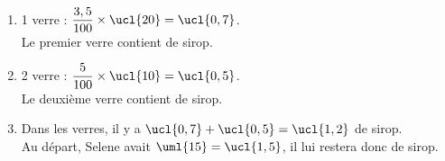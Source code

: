 \ \\ [-5mm]
   \begin{enumerate}
      \item 1 verre : $\dfrac{3,5}{100}\times\ucl{20} =\ucl{0,7}$. \\ [1mm]
         {\blue Le premier verre contient  de sirop}. \smallskip
      \item 2 verre : $\dfrac{5}{100}\times\ucl{10} =\ucl{0,5}$. \\ [1mm]
         {\blue Le deuxième verre contient  de sirop}.
      \item Dans les verres, il y a $\ucl{0,7}+\ucl{0,5} =\ucl{1,2}$ de sirop. \\
         Au départ, Selene avait $\uml{15} = \ucl{1,5}$, {\blue il lui restera donc  de sirop}.
   \end{enumerate}
